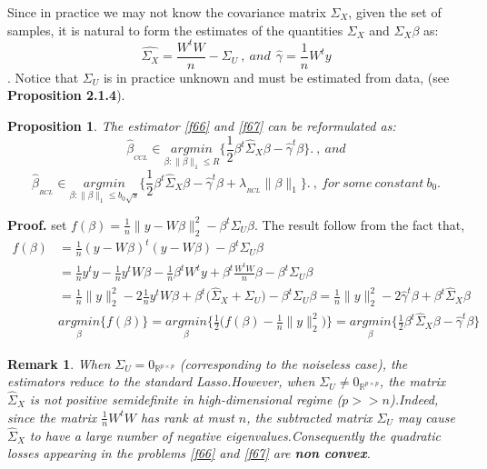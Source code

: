 \documentclass[12pt]{report}
\newtheorem {proposition}{Proposition}[section]  %
\newtheorem{remarque}{Remark}[section]
\begin{document}
Since in practice we may not know the covariance matrix $\Sigma_{X}$, given the set of samples, it is natural to form the estimates of the quantities $\Sigma_{X}$ and $\Sigma_{X}\beta$ as:$$\hat{\Sigma_{X}}=\frac{W^{t}W}{n}-\Sigma_{U}\ ,\ and\ \ \hat{\gamma}=\frac{1}{n}W^{t}y$$.
Notice that $\Sigma_{U}$ is in practice unknown and must be estimated from data, (see \textbf{Proposition 2.1.4}).
\begin{proposition}
	The estimator \eqref{f66} and \eqref{f67} can be reformulated as:
	\begin{equation}
			\hat{\beta}_{_{CCL}}\in \underset{\beta:\parallel\beta\parallel_{1}\leq R}{argmin}\bigg\{\frac{1}{2}\beta^{t}\hat{\Sigma}_{X}\beta-\hat{\gamma}^{t}\beta\bigg\}.\ ,\ and
		\label{f68}
	\end{equation}
	\begin{equation}
	\hat{\beta}_{_{RCL}}\in \underset{\beta:\parallel\beta\parallel_{1}\leq b_{0}\sqrt{s}}{argmin}\bigg\{\frac{1}{2}\beta^{t}\hat{\Sigma}_{X}\beta-\hat{\gamma}^{t}\beta+\lambda_{_{RCL}}\parallel\beta\parallel_{1}\bigg\}.\ ,\ for\ some\ constant\ b_{0} .
	\label{f69}
\end{equation}
\end{proposition}
\textbf{Proof.} set $f(\beta)=\frac{1}{n}\parallel y- W\beta \parallel^{2}_{2}-\beta^{t}\Sigma_{U}\beta$. The result follow from the fact that,
\begin{align*}
	f(\beta)&=\frac{1}{n}(y-W\beta)^{t}(y-W\beta)-\beta^{t}\Sigma_{U}\beta\\
&	=\frac{1}{n}y^{t}y-\frac{1}{n}y^{t}W\beta-\frac{1}{n}\beta^{t}W^{t}y+\beta^{t}\frac{W^{t}W}{n}\beta-\beta^{t}\Sigma_{U}\beta\\
&	=\frac{1}{n}\parallel y\parallel_{2}^{2}-2\frac{1}{n}y^{t}W\beta +\beta^{t}\big(\hat{\Sigma}_{X}+\Sigma_{U}\big)-\beta^{t}\Sigma_{U}\beta
	=\frac{1}{n}\parallel y\parallel_{2}^{2}-2\hat{\gamma}^{t}\beta+\beta^{t}\hat{\Sigma}_{X}\beta \\
&\underset{\beta}{argmin}\big\{f(\beta)\big\}=\underset{\beta}{argmin}\bigg\{\frac{1}{2}\big(f(\beta)-\frac{1}{n}\parallel y\parallel_{2}^{2}\big)\bigg\}=\underset{\beta}{argmin}\bigg\{\frac{1}{2}\beta^{t}\hat{\Sigma}_{X}\beta-\hat{\gamma}^{t}\beta\bigg\}
\end{align*}
\begin{remarque}
	When $\Sigma_{U}=0_{\mathbb{R}^{p\times p}}$ (corresponding to the noiseless case), the estimators reduce to the standard Lasso.However, when $\Sigma_{U} \neq0_{\mathbb{R}^{p\times p}}$, the matrix $\hat{\Sigma}_{X}$ is not positive semidefinite in high-dimensional regime ($p>>n$).Indeed, since the matrix $\frac{1}{n}W^{t}W$ has rank at must $n$, the subtracted matrix $\Sigma_{U}$ may cause $\hat{\Sigma}_{X}$ to have a large number of negative eigenvalues.Consequently the quadratic losses appearing in the problems \eqref{f66} and \eqref{f67} are \textbf{non convex}.
\end{remarque}
\end{document}
